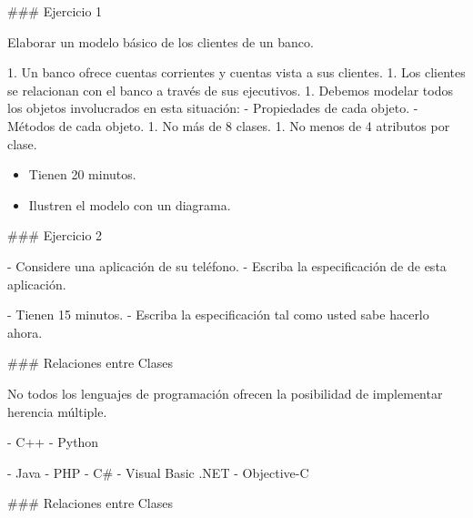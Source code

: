 ### Ejercicio 1

Elaborar un modelo básico de los clientes de un banco.

1. Un banco ofrece cuentas corrientes y cuentas vista a sus clientes.
1. Los clientes se relacionan con el banco a través de sus ejecutivos.
1. Debemos modelar todos los objetos involucrados en esta situación:
    - Propiedades de cada objeto.
    - Métodos de cada objeto.
1. No más de 8 clases.
1. No menos de 4 atributos por clase.
\vfill


\begin{center}\begin{customRoundedBox}{}%
\begin{itemize}
  \item Tienen 20 minutos.
  \item Ilustren el modelo con un diagrama.
\end{itemize}
\end{customRoundedBox}
\end{center}


### Ejercicio 2

- Considere una aplicación de su teléfono.
- Escriba la especificación de  de esta aplicación.


\importantboxbegin

- Tienen 15 minutos.
- Escriba la especificación tal como usted sabe hacerlo ahora.

\importantboxend

### Relaciones entre Clases


No todos los lenguajes de programación ofrecen la posibilidad de implementar herencia múltiple.

\vspace{-2em}
\columnsbegin



- C++
- Python

\importantboxend




- Java
- PHP
- C#
- Visual Basic .NET
- Objective-C

\importantboxend

\columnsend

### Relaciones entre Clases

